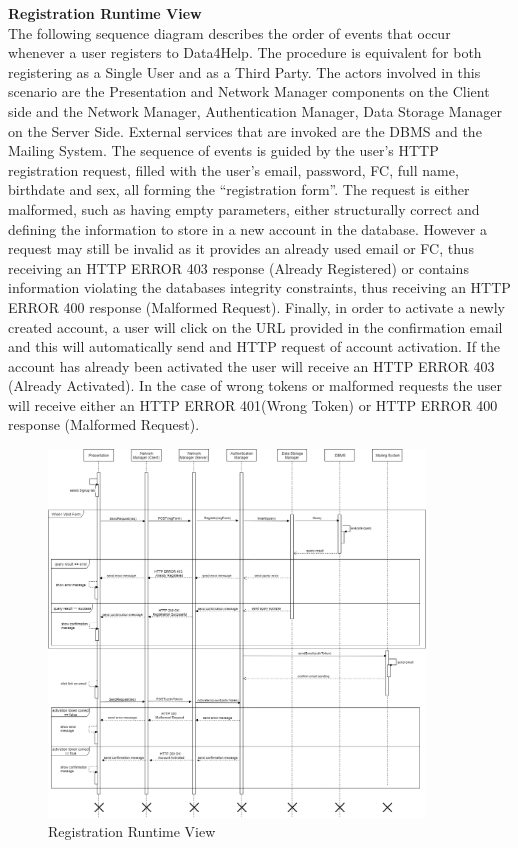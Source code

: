 \documentclass[titlepage]{article}
\begin{document}
{\bf Registration Runtime View }\\ 
The following sequence diagram describes the order of events that occur whenever a user registers to Data4Help. The procedure is equivalent for both registering as a Single User and as a Third Party. The actors involved in this scenario are the Presentation and Network Manager components on the Client side and the Network Manager, Authentication Manager, Data Storage Manager on the Server Side. External services that are invoked are the DBMS and the Mailing System.
The sequence of events is guided by the user’s HTTP registration request, filled with the user’s email, password, FC, full name, birthdate and sex, all forming the “registration form”. The request is either malformed, such as having empty parameters, either structurally correct and defining the information to store in a new account in the database. However a request may still be invalid as it provides an already used email or FC, thus receiving an HTTP ERROR 403 response (Already Registered) or contains information violating the databases integrity constraints, thus receiving an HTTP ERROR 400 response (Malformed Request).
Finally, in order to activate a newly created account, a user will click on the URL provided in the confirmation email and this will automatically send and HTTP request of account activation. If the account has already been activated the user will receive an HTTP ERROR 403 (Already Activated). In the case of wrong tokens or malformed requests the user will receive either an HTTP ERROR 401(Wrong Token) or HTTP ERROR 400 response (Malformed Request).

\begin{figure}[H]
	\center
  	\includegraphics[width=10cm]{Registration.png} %
  	\caption{Registration Runtime View}
 	\label{fig:REG}
\end{figure}
\end{document}
